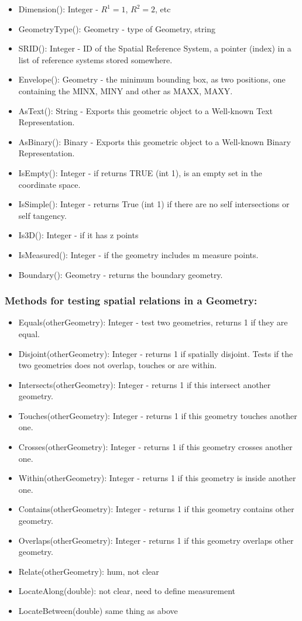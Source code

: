 \documentclass[11pt]{article}
\begin{document}
\begin{itemize}
\item Dimension(): Integer - $R^{1} = 1$, $R^{2} = 2$, etc
\item GeometryType(): Geometry -  type of Geometry, string
\item SRID(): Integer -  ID of the Spatial Reference System, a pointer (index) in a list of reference systems stored somewhere.
\item Envelope():  Geometry - the minimum bounding box, as two positions, one containing the MINX, MINY and other as MAXX, MAXY.
\item AsText(): String - Exports this geometric object to a Well-known Text Representation.
\item AsBinary(): Binary - Exports this geometric object to a Well-known Binary Representation.
\item IsEmpty(): Integer - if returns TRUE (int 1), is an empty set in the coordinate space.
\item IsSimple(): Integer - returns True (int 1) if there are no self intersections or self tangency.
\item Is3D(): Integer - if it has z points
\item IsMeasured(): Integer - if the geometry includes m measure points.
\item Boundary(): Geometry - returns the boundary geometry.
\end{itemize}
\subsubsection{Methods for testing spatial relations in a Geometry:}
\begin{itemize}
\item Equals(otherGeometry):  Integer - test two geometries, returns 1 if they are equal.
\item Disjoint(otherGeometry): Integer -  returns 1 if spatially disjoint. Tests if the two geometries does not overlap, touches or are within.
\item Intersects(otherGeometry): Integer -  returns 1 if this intersect another geometry.
\item Touches(otherGeometry): Integer -  returns 1 if this geometry touches another one.
\item Crosses(otherGeometry): Integer -  returns 1 if this geometry crosses another one.
\item Within(otherGeometry):  Integer - returns 1 if this geometry is inside another one.
\item Contains(otherGeometry):  Integer - returns 1 if this geometry contains other geometry.
\item Overlaps(otherGeometry):  Integer - returns 1 if this geometry overlaps other geometry.
\item Relate(otherGeometry): hum, not clear
\item LocateAlong(double): not clear, need to define measurement
\item LocateBetween(double) same thing as above
\end{itemize}
\end{document}

